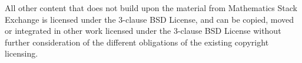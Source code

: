 \documentclass[11pt,a4paper]{article}
\begin{document}
All other content that does not build upon the material from Mathematics Stack Exchange
is licensed under the 3-clause BSD License, and can be copied, moved or integrated in
other work licensed under the 3-clause BSD License without further consideration of the
different obligations of the existing copyright licensing.

\nocite{*}



\end{document}
